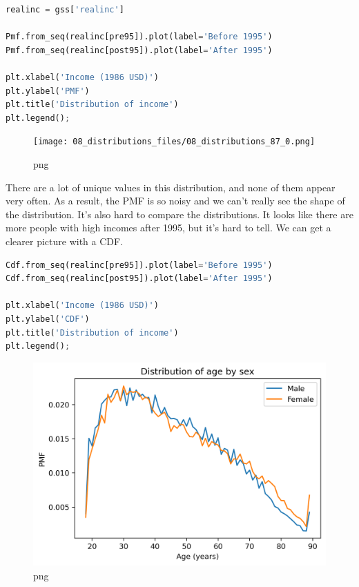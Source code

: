 \documentclass[
]{book}
\begin{document}
\begin{lstlisting}[language=Python]
realinc = gss['realinc']

Pmf.from_seq(realinc[pre95]).plot(label='Before 1995')
Pmf.from_seq(realinc[post95]).plot(label='After 1995')

plt.xlabel('Income (1986 USD)')
plt.ylabel('PMF')
plt.title('Distribution of income')
plt.legend();
\end{lstlisting}

\begin{figure}
\centering
\texttt{[image: 08\_distributions\_files/08\_distributions\_87\_0.png]}
\caption{png}
\end{figure}

There are a lot of unique values in this distribution, and none of them
appear very often. As a result, the PMF is so noisy and we can't really
see the shape of the distribution. It's also hard to compare the
distributions. It looks like there are more people with high incomes
after 1995, but it's hard to tell. We can get a clearer picture with a
CDF.

\begin{lstlisting}[language=Python]
Cdf.from_seq(realinc[pre95]).plot(label='Before 1995')
Cdf.from_seq(realinc[post95]).plot(label='After 1995')

plt.xlabel('Income (1986 USD)')
plt.ylabel('CDF')
plt.title('Distribution of income')
plt.legend();
\end{lstlisting}

\begin{figure}
\centering
\includegraphics{08_distributions_files/08_distributions_89_0.png}
\caption{png}
\end{figure}
\end{document}
